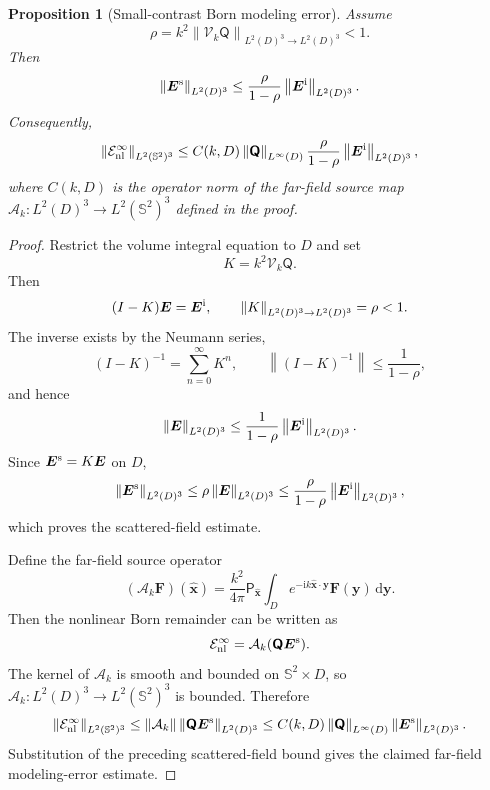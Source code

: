 \documentclass[11pt]{article}
\numberwithin{equation}{section}
\newcommand{\Sph}{\mathbb{S}}
\newcommand{\ii}{\mathrm{i}}
\newcommand{\dd}{\,\mathrm d}
\newcommand{\vect}[1]{\bm{#1}}
\newcommand{\tens}[1]{\bm{\mathsf{#1}}}
\newcommand{\Qt}{\ensuremath{\tens{Q}}}
\newcommand{\norm}[1]{\left\lVert #1\right\rVert}
\theoremstyle{plain}
\newtheorem{proposition}[theorem]{Proposition}
\theoremstyle{definition}
\begin{document}
\begin{proposition}[Small-contrast Born modeling error]\label{prop:born_error}
Assume
\begin{equation*}
  \rho=k^2\norm{\mathcal V_k\Qt}_{L^2(D)^3\to L^2(D)^3}<1.
\end{equation*}
Then
\begin{equation*}
  \norm{\vect{E}^{\rm s}}_{L^2(D)^3}\le \frac{\rho}{1-\rho}\norm{\vect{E}^{\rm i}}_{L^2(D)^3}.
\end{equation*}
Consequently,
\begin{equation*}
  \norm{\mathcal{E}_{\mathrm{nl}}^\infty}_{L^2(\Sph^2)^3}
  \le C(k,D)\norm{\Qt}_{L^\infty(D)}\frac{\rho}{1-\rho}\norm{\vect{E}^{\rm i}}_{L^2(D)^3},
\end{equation*}
where $C(k,D)$ is the operator norm of the far-field source map $\mathcal A_k:L^2(D)^3\to L^2(\Sph^2)^3$ defined in the proof.
\end{proposition}

\begin{proof}
Restrict the volume integral equation to \(D\) and set
\[
  K=k^2\mathcal V_k\Qt .
\]
Then
\[
  (I-K)\vect{E}=\vect{E}^{\rm i},
  \qquad \norm{K}_{L^2(D)^3\to L^2(D)^3}=\rho<1 .
\]
The inverse exists by the Neumann series,
\[
  (I-K)^{-1}=\sum_{n=0}^{\infty}K^n,
  \qquad
  \norm{(I-K)^{-1}}\le \frac{1}{1-\rho},
\]
and hence
\[
  \norm{\vect{E}}_{L^2(D)^3}
  \le \frac{1}{1-\rho}\norm{\vect{E}^{\rm i}}_{L^2(D)^3} .
\]
Since \(\vect{E}^{\rm s}=K\vect{E}\) on \(D\),
\[
  \norm{\vect{E}^{\rm s}}_{L^2(D)^3}
  \le \rho\norm{\vect{E}}_{L^2(D)^3}
  \le \frac{\rho}{1-\rho}\norm{\vect{E}^{\rm i}}_{L^2(D)^3},
\]
which proves the scattered-field estimate.

Define the far-field source operator
\[
  (\mathcal A_k\vect{F})(\hat{\vect{x}})
  =\frac{k^2}{4\pi}\tens{P}_{\hat{\vect{x}}}
  \int_D e^{-\ii k\hat{\vect{x}}\cdot\vect{y}}\vect{F}(\vect{y})\dd\vect{y} .
\]
Then the nonlinear Born remainder can be written as
\[
  \mathcal E_{\mathrm{nl}}^\infty=\mathcal A_k(\Qt\vect{E}^{\rm s}) .
\]
The kernel of \(\mathcal A_k\) is smooth and bounded on \(\Sph^2\times D\), so \(\mathcal A_k:L^2(D)^3\to L^2(\Sph^2)^3\) is bounded.  Therefore
\[
  \norm{\mathcal E_{\mathrm{nl}}^\infty}_{L^2(\Sph^2)^3}
  \le \norm{\mathcal A_k}\norm{\Qt\vect{E}^{\rm s}}_{L^2(D)^3}
  \le C(k,D)\norm{\Qt}_{L^\infty(D)}\norm{\vect{E}^{\rm s}}_{L^2(D)^3} .
\]
Substitution of the preceding scattered-field bound gives the claimed far-field modeling-error estimate.
\end{proof}
\end{document}
